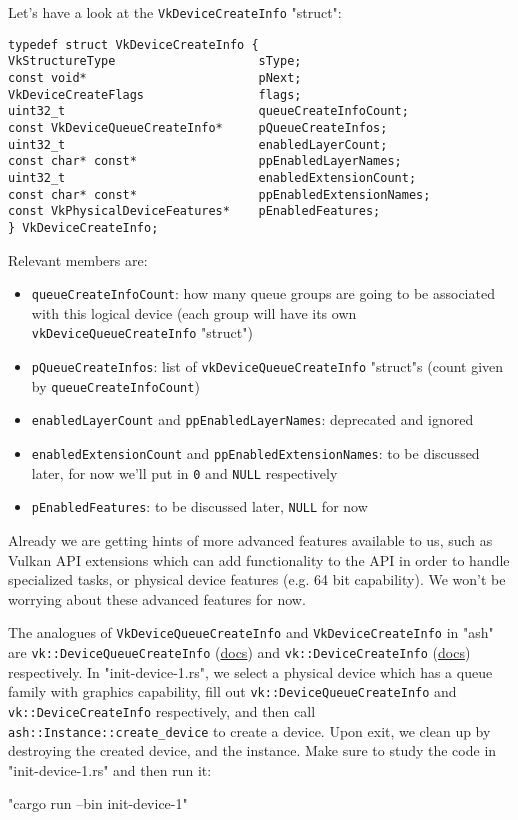\documentclass[12pt,letterpaper]{article}
\newcommand{\ril}[1]{\texttt{#1}}
\newcommand{\cil}[1]{\texttt{#1}}
\begin{document}
		Let's have a look at the \cil{VkDeviceCreateInfo} "struct":
\begin{verbatim}
typedef struct VkDeviceCreateInfo {
VkStructureType                    sType;
const void*                        pNext;
VkDeviceCreateFlags                flags;
uint32_t                           queueCreateInfoCount;
const VkDeviceQueueCreateInfo*     pQueueCreateInfos;
uint32_t                           enabledLayerCount;
const char* const*                 ppEnabledLayerNames;
uint32_t                           enabledExtensionCount;
const char* const*                 ppEnabledExtensionNames;
const VkPhysicalDeviceFeatures*    pEnabledFeatures;
} VkDeviceCreateInfo;
\end{verbatim}
		Relevant members are:
			\begin{itemize}
				\item \cil{queueCreateInfoCount}: how many queue groups are going to be associated with this logical device (each group will have its own \cil{vkDeviceQueueCreateInfo} "struct")
				
				\item \cil{pQueueCreateInfos}: list of \cil{vkDeviceQueueCreateInfo} "struct"s 
				(count given by \cil{queueCreateInfoCount})
				
				\item \cil{enabledLayerCount} and \cil{ppEnabledLayerNames}: deprecated and ignored
				
				\item \cil{enabledExtensionCount} and \cil{ppEnabledExtensionNames}: to be discussed later, for now we'll put in \cil{0} and \cil{NULL} respectively
				
				\item \cil{pEnabledFeatures}: to be discussed later, \cil{NULL} for now
			\end{itemize}
		Already we are getting hints of more advanced features available to us, such as Vulkan API extensions which can add functionality to the API in order to handle specialized tasks, or physical device features (e.g. 64 bit capability). We won't be worrying about these advanced features for now.
		
		The analogues of \cil{VkDeviceQueueCreateInfo} and \cil{VkDeviceCreateInfo} in "ash" are \ril{vk::DeviceQueueCreateInfo} (\href{https://docs.rs/ash/0.20.2/ash/vk/types/struct.DeviceQueueCreateInfo.html}{docs}) and \ril{vk::DeviceCreateInfo} (\href{https://docs.rs/ash/0.20.2/ash/vk/types/struct.DeviceCreateInfo.html}{docs}) respectively. In "init-device-1.rs", we select a physical device which has a queue family with graphics capability, fill out \ril{vk::DeviceQueueCreateInfo} and \ril{vk::DeviceCreateInfo} respectively, and then call \ril{ash::Instance::create_device} to create a device. Upon exit, we clean up by destroying the created device, and the instance. Make sure to study the code in "init-device-1.rs" and then run it:
			\begin{center}
				"cargo run --bin init-device-1"
			\end{center}
		
		 
\end{document}
